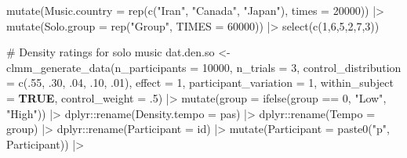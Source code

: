 \documentclass[
  bookmarksnumbered]{article}
\newenvironment{Shaded}{\begin{snugshade}}{\end{snugshade}}
\newcommand{\AttributeTok}[1]{\textcolor[rgb]{0.80,0.80,0.80}{#1}}
\newcommand{\CommentTok}[1]{\textcolor[rgb]{0.50,0.62,0.50}{#1}}
\newcommand{\ConstantTok}[1]{\textcolor[rgb]{0.86,0.64,0.64}{\textbf{#1}}}
\newcommand{\DecValTok}[1]{\textcolor[rgb]{0.86,0.86,0.80}{#1}}
\newcommand{\FunctionTok}[1]{\textcolor[rgb]{0.94,0.94,0.56}{#1}}
\newcommand{\NormalTok}[1]{\textcolor[rgb]{0.80,0.80,0.80}{#1}}
\newcommand{\OtherTok}[1]{\textcolor[rgb]{0.94,0.94,0.56}{#1}}
\newcommand{\SpecialCharTok}[1]{\textcolor[rgb]{0.86,0.64,0.64}{#1}}
\newcommand{\StringTok}[1]{\textcolor[rgb]{0.80,0.58,0.58}{#1}}
\begin{document}
\begin{Shaded}
\begin{Highlighting}[]
  \FunctionTok{mutate}\NormalTok{(}\AttributeTok{Music.country =} \FunctionTok{rep}\NormalTok{(}\FunctionTok{c}\NormalTok{(}\StringTok{"Iran"}\NormalTok{, }\StringTok{"Canada"}\NormalTok{, }\StringTok{"Japan"}\NormalTok{), }\AttributeTok{times =} \DecValTok{20000}\NormalTok{)) }\SpecialCharTok{|\textgreater{}}
  \FunctionTok{mutate}\NormalTok{(}\AttributeTok{Solo.group =} \FunctionTok{rep}\NormalTok{(}\StringTok{"Group"}\NormalTok{, }\AttributeTok{TIMES =} \DecValTok{60000}\NormalTok{)) }\SpecialCharTok{|\textgreater{}}
  \FunctionTok{select}\NormalTok{(}\FunctionTok{c}\NormalTok{(}\DecValTok{1}\NormalTok{,}\DecValTok{6}\NormalTok{,}\DecValTok{5}\NormalTok{,}\DecValTok{2}\NormalTok{,}\DecValTok{7}\NormalTok{,}\DecValTok{3}\NormalTok{))}

\CommentTok{\# Density ratings for solo music}
\NormalTok{dat.den.so }\OtherTok{\textless{}{-}} \FunctionTok{clmm\_generate\_data}\NormalTok{(}\AttributeTok{n\_participants =} \DecValTok{10000}\NormalTok{,}
                                 \AttributeTok{n\_trials =} \DecValTok{3}\NormalTok{,}
                                 \AttributeTok{control\_distribution =} \FunctionTok{c}\NormalTok{(.}\DecValTok{55}\NormalTok{, .}\DecValTok{30}\NormalTok{, .}\DecValTok{04}\NormalTok{, .}\DecValTok{10}\NormalTok{, .}\DecValTok{01}\NormalTok{),}
                                 \AttributeTok{effect =} \DecValTok{1}\NormalTok{,}
                                 \AttributeTok{participant\_variation =} \DecValTok{1}\NormalTok{,}
                                 \AttributeTok{within\_subject =} \ConstantTok{TRUE}\NormalTok{,}
                                 \AttributeTok{control\_weight =}\NormalTok{ .}\DecValTok{5}\NormalTok{) }\SpecialCharTok{|\textgreater{}}
  \FunctionTok{mutate}\NormalTok{(}\AttributeTok{group =} \FunctionTok{ifelse}\NormalTok{(group }\SpecialCharTok{==} \DecValTok{0}\NormalTok{, }\StringTok{"Low"}\NormalTok{, }\StringTok{"High"}\NormalTok{)) }\SpecialCharTok{|\textgreater{}}
\NormalTok{  dplyr}\SpecialCharTok{::}\FunctionTok{rename}\NormalTok{(}\AttributeTok{Density.tempo =}\NormalTok{ pas) }\SpecialCharTok{|\textgreater{}}
\NormalTok{  dplyr}\SpecialCharTok{::}\FunctionTok{rename}\NormalTok{(}\AttributeTok{Tempo =}\NormalTok{ group) }\SpecialCharTok{|\textgreater{}}
\NormalTok{  dplyr}\SpecialCharTok{::}\FunctionTok{rename}\NormalTok{(}\AttributeTok{Participant =}\NormalTok{ id) }\SpecialCharTok{|\textgreater{}}
  \FunctionTok{mutate}\NormalTok{(}\AttributeTok{Participant =} \FunctionTok{paste0}\NormalTok{(}\StringTok{"p"}\NormalTok{, Participant)) }\SpecialCharTok{|\textgreater{}}

\end{Highlighting}
\end{Shaded}
\end{document}
